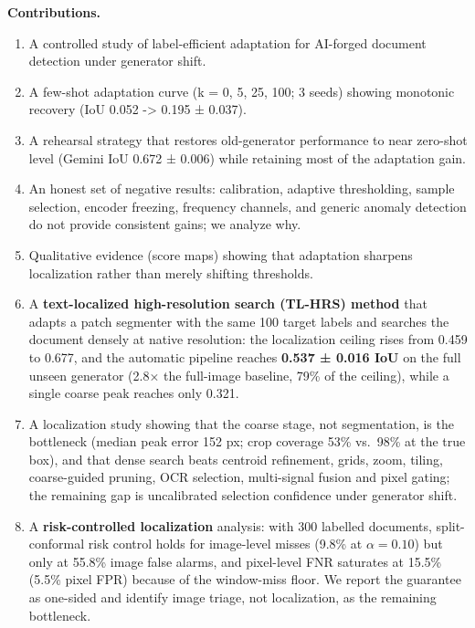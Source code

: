 \documentclass[preprint,12pt]{elsarticle}
\providecommand{\tightlist}{} %
\begin{document}
\textbf{Contributions.}

\begin{enumerate}
\def\labelenumi{\arabic{enumi}.}
\tightlist
\item
  A controlled study of label-efficient adaptation for AI-forged document detection under generator shift.
\item
  A few-shot adaptation curve (k = 0, 5, 25, 100; 3 seeds) showing monotonic recovery (IoU 0.052 -\textgreater{} 0.195 ± 0.037).
\item
  A rehearsal strategy that restores old-generator performance to near zero-shot level (Gemini IoU 0.672 ± 0.006) while retaining most of the adaptation gain.
\item
  An honest set of negative results: calibration, adaptive thresholding, sample selection, encoder freezing, frequency channels, and generic anomaly detection do not provide consistent gains; we analyze why.
\item
  Qualitative evidence (score maps) showing that adaptation sharpens localization rather than merely shifting thresholds.
\item
  A \textbf{text-localized high-resolution search (TL-HRS) method} that adapts a patch segmenter with the same 100 target labels and searches the document densely at native resolution: the localization ceiling rises from 0.459 to 0.677, and the automatic pipeline reaches \textbf{0.537 ± 0.016 IoU} on the full unseen generator (2.8× the full-image baseline, 79\% of the ceiling), while a single coarse peak reaches only 0.321.
\item
  A localization study showing that the coarse stage, not segmentation, is the bottleneck (median peak error 152 px; crop coverage 53\% vs.~98\% at the true box), and that dense search beats centroid refinement, grids, zoom, tiling, coarse-guided pruning, OCR selection, multi-signal fusion and pixel gating; the remaining gap is uncalibrated selection confidence under generator shift.
\item
  A \textbf{risk-controlled localization} analysis: with 300 labelled documents, split-conformal risk control holds for image-level misses (9.8\% at $\alpha=0.10$) but only at 55.8\% image false alarms, and pixel-level FNR saturates at 15.5\% (5.5\% pixel FPR) because of the window-miss floor. We report the guarantee as one-sided and identify image triage, not localization, as the remaining bottleneck.
\end{enumerate}

\bigskip
\end{document}

